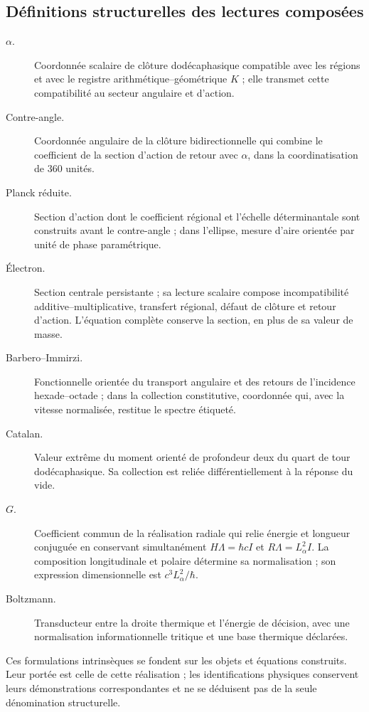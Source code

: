 \subsection{Définitions structurelles des lectures composées}
\label{md:compos:definiciones}

\begin{description}
 \item[$\alpha$.] Coordonnée scalaire de clôture dodécaphasique compatible avec
 les régions et avec le registre arithmétique--géométrique $K$ ; elle transmet cette
 compatibilité au secteur angulaire et d’action.
 \item[Contre-angle.] Coordonnée angulaire de la clôture bidirectionnelle qui
 combine le coefficient de la section d’action de retour avec $\alpha$,
 dans la coordinatisation de $360$ unités.
 \item[Planck réduite.] Section d’action dont le coefficient régional et l’échelle
 déterminantale sont construits avant le contre-angle ; dans l’ellipse, mesure
 d’aire orientée par unité de phase paramétrique.
 \item[Électron.] Section centrale persistante ; sa lecture scalaire compose
 incompatibilité additive--multiplicative, transfert régional, défaut
 de clôture et retour d’action. L’équation complète conserve la section,
 en plus de sa valeur de masse.
 \item[Barbero--Immirzi.] Fonctionnelle orientée du transport angulaire et des
 retours de l’incidence hexade--octade ; dans la collection constitutive,
 coordonnée qui, avec la vitesse normalisée, restitue le spectre
 étiqueté.
 \item[Catalan.] Valeur extrême du moment orienté de profondeur deux du
 quart de tour dodécaphasique. Sa collection est reliée différentiellement à la
 réponse du vide.
 \item[$G$.] Coefficient commun de la réalisation radiale qui relie
 énergie et longueur conjuguée en conservant simultanément
 $H\Lambda=\hbar cI$ et $R\Lambda=L_\alpha^2I$.
 La composition longitudinale et polaire détermine sa normalisation ;
 son expression dimensionnelle est $c^3L_\alpha^2/\hbar$.
 \item[Boltzmann.] Transducteur entre la droite thermique et l’énergie de
 décision, avec une normalisation informationnelle tritique et une base thermique déclarées.
\end{description}
Ces formulations intrinsèques se fondent sur les objets et équations
construits. Leur portée est celle de cette réalisation ; les identifications
physiques conservent leurs démonstrations correspondantes et ne se déduisent pas de
la seule dénomination structurelle.


